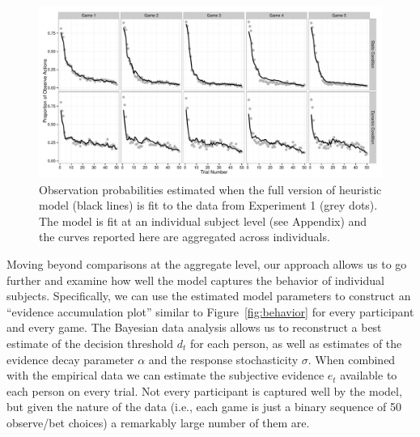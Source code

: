 \documentclass[authoryear]{elsarticle}
\begin{document}
\begin{figure}[t]
\begin{center}
\includegraphics[scale=.5]{modelPredictions1.pdf}
\caption{Observation probabilities estimated when the full version of heuristic model (black lines) is fit to the data from Experiment 1 (grey dots). The model is fit at an individual subject level (see Appendix) and the curves reported here are aggregated across individuals.}
\label{fig:modelfits1}
\end{center}
\end{figure}


Moving beyond comparisons at the aggregate level, our approach allows us to go further and examine how well the model captures the behavior of individual subjects. Specifically, we can use the estimated model parameters to construct an ``evidence accumulation plot'' similar to Figure~\ref{fig:behavior} for every participant and every game. The Bayesian data analysis allows us to reconstruct a best estimate of the decision threshold $d_t$ for each person, as well as estimates of the evidence decay parameter $\alpha$ and the response stochasticity $\sigma$. When combined with the empirical data we can estimate the subjective evidence $e_t$ available to each person on every trial. Not every participant is captured well by the model, but given the nature of the data (i.e., each game is just a binary sequence of 50 observe/bet choices) a remarkably large number of them are.
\end{document}
